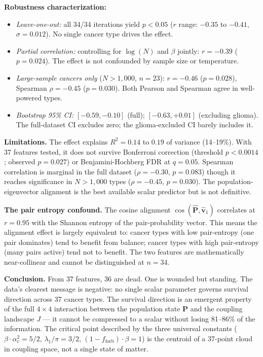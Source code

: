 \documentclass[
  11pt,
]{article}
\providecommand{\tightlist}{%
  \setlength{\itemsep}{0pt}\setlength{\parskip}{0pt}}
\begin{document}
\textbf{Robustness characterization:}

\begin{itemize}
\tightlist
\item
  \emph{Leave-one-out:} all 34/34 iterations yield \(p < 0.05\) (\(r\)
  range: \(-0.35\) to \(-0.41\), \(\sigma = 0.012\)). No single cancer
  type drives the effect.
\item
  \emph{Partial correlation:} controlling for \(\log(N)\) and \(\beta\)
  jointly: \(r = -0.39\) (\(p = 0.024\)). The effect is not confounded
  by sample size or temperature.
\item
  \emph{Large-sample cancers only} (\(N > 1{,}000\), \(n = 23\)):
  \(r = -0.46\) (\(p = 0.028\)), Spearman \(\rho = -0.45\)
  (\(p = 0.030\)). Both Pearson and Spearman agree in well-powered
  types.
\item
  \emph{Bootstrap 95\% CI:} \([-0.59, -0.10]\) (full);
  \([-0.63, +0.01]\) (excluding glioma). The full-dataset CI excludes
  zero; the glioma-excluded CI barely includes it.
\end{itemize}

\textbf{Limitations.} The effect explains \(R^2 = 0.14\) to \(0.19\) of
variance (14--19\%). With 37 features tested, it does not survive
Bonferroni correction (threshold \(p < 0.0014\); observed \(p = 0.027\))
or Benjamini-Hochberg FDR at \(q = 0.05\). Spearman correlation is
marginal in the full dataset (\(\rho = -0.30\), \(p = 0.083\)) though it
reaches significance in \(N > 1{,}000\) types (\(\rho = -0.45\),
\(p = 0.030\)). The population-eigenvector alignment is the best
available scalar predictor but is not definitive.

\textbf{The pair entropy confound.} The cosine alignment
\(\cos(\hat{\mathbf{P}}, \hat{\mathbf{v}}_1)\) correlates at
\(r = 0.95\) with the Shannon entropy of the pair-probability vector.
This means the alignment effect is largely equivalent to: cancer types
with low pair-entropy (one pair dominates) tend to benefit from balance;
cancer types with high pair-entropy (many pairs active) tend not to
benefit. The two features are mathematically near-collinear and cannot
be distinguished at \(n = 34\).

\textbf{Conclusion.} From 37 features, 36 are dead. One is wounded but
standing. The data's clearest message is negative: no single scalar
parameter governs survival direction across 37 cancer types. The
survival direction is an emergent property of the full \(4 \times 4\)
interaction between the population state \(\mathbf{P}\) and the coupling
landscape \(J\) --- it cannot be compressed to a scalar without losing
81--86\% of the information. The critical point described by the three
universal constants (\(\beta \cdot \alpha_c^2 = 5/2\),
\(\lambda_1/\pi = 3/2\), \((1 - f_\mathrm{forb}) \cdot \beta = 1\)) is
the centroid of a 37-point cloud in coupling space, not a single state
of matter.
\end{document}
